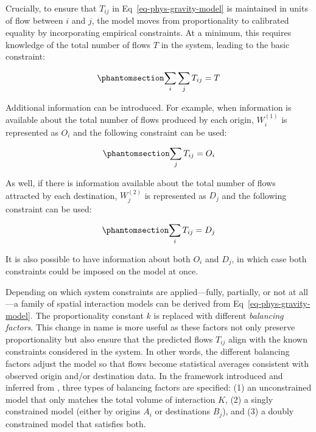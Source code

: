 \documentclass[
  10pt,
  letterpaper,
]{article}
\begin{document}
Crucially, to ensure that \(T_{ij}\) in Eq~\ref{eq-phys-gravity-model}
is maintained in units of flow between \(i\) and \(j\), the model moves
from proportionality to calibrated equality by incorporating empirical
constraints. At a minimum, this requires knowledge of the total number
of flows \(T\) in the system, leading to the basic constraint:

\begin{equation}\phantomsection\label{eq-constraint0-gravitymodel}{
\sum_i\sum_j T_{ij} = T
}\end{equation}

Additional information can be introduced. For example, when information
is available about the total number of flows produced by each origin,
\(W_i^{(1)}\) is represented as \(O_i\) and the following constraint can
be used:

\begin{equation}\phantomsection\label{eq-constraint1-gravitymodel}{
\sum_j T_{ij} = O_i
}\end{equation}

As well, if there is information available about the total number of
flows attracted by each destination, \(W_j^{(2)}\) is represented as
\(D_j\) and the following constraint can be used:

\begin{equation}\phantomsection\label{eq-constraint2-gravitymodel}{
\sum_i T_{ij} = D_j
}\end{equation}

It is also possible to have information about both \(O_i\) and \(D_j\),
in which case both constraints could be imposed on the model at once.

Depending on which system constraints are applied---fully, partially, or
not at all---a family of spatial interaction models can be derived from
Eq~\ref{eq-phys-gravity-model}. The proportionality constant \(k\) is
replaced with different \emph{balancing factors}. This change in name is
more useful as these factors not only preserve proportionality but also
ensure that the predicted flows \(T_{ij}\) align with the known
constraints considered in the system. In other words, the different
balancing factors adjust the model so that flows become statistical
averages consistent with observed origin and/or destination data. In the
framework introduced and inferred from \citet{wilson1971}, three types
of balancing factors are specified: (1) an unconstrained model that only
matches the total volume of interaction \(K\), (2) a singly constrained
model (either by origins \(A_i\) or destinations \(B_j\)), and (3) a
doubly constrained model that satisfies both.
\end{document}

